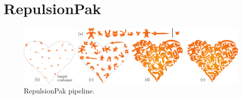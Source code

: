 
\chapter{RepulsionPak}

\begin{figure}
\centering
\includegraphics[width=1.0\textwidth]{figures/repulsionpak/pipeline.pdf} 
\caption{\label{fig_repulsionpak_pipeline} 
RepulsionPak pipeline. }
\end{figure}